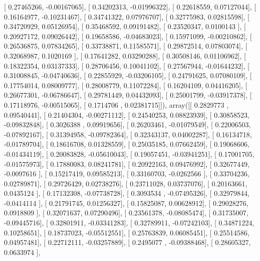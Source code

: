 \documentclass{article}
\begin{document}
       [ 0.27465266, -0.00167065],
       [ 0.34202313, -0.01996322],
       [ 0.22618559,  0.07127044],
       [ 0.16164977, -0.10231467],
       [ 0.34741322,  0.07976707],
       [ 0.32775983,  0.02815598],
       [ 0.34720929,  0.05126954],
       [ 0.35468592,  0.09191482],
       [ 0.23520347,  0.0100143 ],
       [ 0.20927172,  0.09026442],
       [ 0.19658586, -0.04683023],
       [ 0.15971099, -0.00210862],
       [ 0.26536875,  0.07834265],
       [ 0.33738871,  0.11585571],
       [ 0.29872514,  0.07803074],
       [ 0.32068987,  0.1020169 ],
       [ 0.17641282,  0.03290288],
       [ 0.30508146,  0.01106962],
       [ 0.18322354,  0.03137333],
       [ 0.28706456,  0.10041102],
       [ 0.27567944, -0.01644232],
       [ 0.31008845, -0.04740636],
       [ 0.22855929, -0.03206105],
       [ 0.24791625,  0.07080109],
       [ 0.17754014,  0.08009777],
       [ 0.28008779,  0.11072284],
       [ 0.16204109,  0.04416205],
       [ 0.26677301, -0.06786647],
       [ 0.29781449,  0.04432093],
       [ 0.25001799, -0.03917378],
       [ 0.17118976, -0.00515065],
       [ 0.1714706 ,  0.02381715]]), array([[ 0.2829773 ,  0.09540441],
       [ 0.21404304, -0.00271112],
       [ 0.24540253,  0.08823939],
       [ 0.30858523, -0.09832848],
       [ 0.3026388 ,  0.09919656],
       [ 0.26203461, -0.01079549],
       [ 0.22006503, -0.07892167],
       [ 0.31394958, -0.09782364],
       [ 0.32343137,  0.04002287],
       [ 0.16134718, -0.01789704],
       [ 0.18616708,  0.01328559],
       [ 0.25035185,  0.07662459],
       [ 0.19068606, -0.01434119],
       [ 0.20083828, -0.05610043],
       [ 0.19057451, -0.03941251],
       [ 0.17001705, -0.01575973],
       [ 0.17880083,  0.08241781],
       [ 0.20922163,  0.09476992],
       [ 0.32677449, -0.0097616 ],
       [ 0.15217419,  0.09585213],
       [ 0.33160703, -0.0262566 ],
       [ 0.33704236,  0.02789871],
       [ 0.29726429,  0.02738276],
       [ 0.23711028,  0.03737076],
       [ 0.20163661,  0.0435124 ],
       [ 0.17132308, -0.07738728],
       [ 0.3093534 , -0.07495326],
       [ 0.32979844, -0.0414114 ],
       [ 0.21791745,  0.01256327],
       [ 0.15825087,  0.00628912],
       [ 0.29028276,  0.0918809 ],
       [ 0.32071637,  0.07290496],
       [ 0.23561378, -0.08085474],
       [ 0.31735007, -0.09445716],
       [ 0.32801911, -0.03341283],
       [ 0.32789911, -0.07242103],
       [ 0.34871224,  0.10258651],
       [ 0.18737023, -0.05512551],
       [ 0.25763839,  0.06085451],
       [ 0.25514586,  0.04957481],
       [ 0.22712111, -0.03257889],
       [ 0.2495077 , -0.09388468],
       [ 0.28605327,  0.0633974 ],
\end{document}
